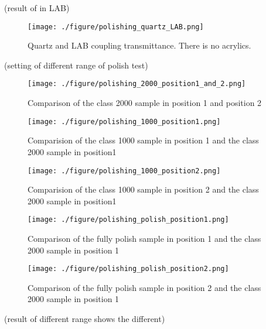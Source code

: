 (result of in LAB)
\begin{figure}
    \centering
    \texttt{[image: ./figure/polishing\_quartz\_LAB.png]}
    \caption{Quartz and LAB coupling transmittance. There is no acrylics.}
    \label{polishing_quartz_LAB.png}
    \end{figure}



(setting of different range of polish test)
\begin{figure}
    \centering
    \texttt{[image: ./figure/polishing\_2000\_position1\_and\_2.png]}
    \caption{Comparison of the class 2000 sample in position 1 and position 2}
    \label{polishing_2000_position1_and_2.png}
    \end{figure}



\begin{figure}
    \centering
    \texttt{[image: ./figure/polishing\_1000\_position1.png]}
    \caption{Comparision of the class 1000 sample in position 1 and the class 2000 sample in position1}
    \label{polishing_1000_position1.png}
    \end{figure}


\begin{figure}
    \centering
    \texttt{[image: ./figure/polishing\_1000\_position2.png]}
    \caption{Comparision of the class 1000 sample in position 2 and the class 2000 sample in position1}
    \label{polishing_1000_position2.png}
    \end{figure}

\begin{figure}
    \centering
    \texttt{[image: ./figure/polishing\_polish\_position1.png]}
    \caption{Comparison of the fully polish sample in position 1 and the class 2000 sample in position 1}
    \label{polishing_polish_position1.png}
    \end{figure}

\begin{figure}
    \centering
    \texttt{[image: ./figure/polishing\_polish\_position2.png]}
    \caption{Comparison of the fully polish sample in position 2 and the class 2000 sample in position 1}
    \label{polishing_polish_position2.png}
    \end{figure}


(result of different range shows the different)

